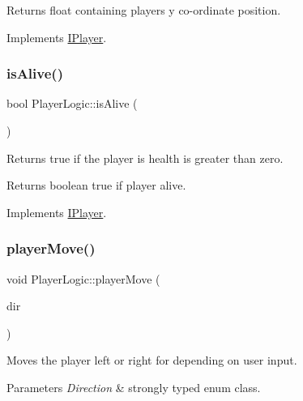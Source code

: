 \begin{DoxyReturn}{Returns}
float containing players y co-\/ordinate position. 
\end{DoxyReturn}


Implements \hyperlink{class_i_player}{I\+Player}.

\mbox{\label{class_player_logic_a765133271ba47a6fa9b2b45136f1fe73}} 
\subsubsection{\texorpdfstring{is\+Alive()}{isAlive()}}
{\footnotesize\ttfamily bool Player\+Logic\+::is\+Alive (\begin{DoxyParamCaption}{ }\end{DoxyParamCaption})\hspace{0.3cm}{\ttfamily [virtual]}}



Returns true if the player is health is greater than zero. 

\begin{DoxyReturn}{Returns}
boolean true if player alive. 
\end{DoxyReturn}


Implements \hyperlink{class_i_player}{I\+Player}.

\mbox{\label{class_player_logic_a2b63d2c01e898e5798c2801466c8b432}} 
\subsubsection{\texorpdfstring{player\+Move()}{playerMove()}}
{\footnotesize\ttfamily void Player\+Logic\+::player\+Move (\begin{DoxyParamCaption}\item[{Direction}]{dir }\end{DoxyParamCaption})\hspace{0.3cm}{\ttfamily [virtual]}}



Moves the player left or right for depending on user input. 


\begin{DoxyParams}{Parameters}
{\em Direction} & strongly typed enum class. \\
\hline
\end{DoxyParams}


